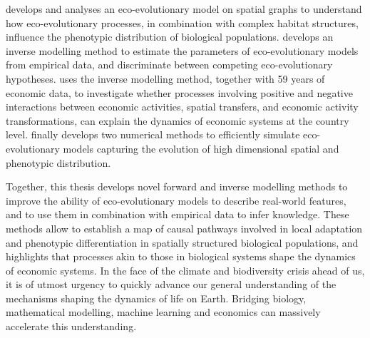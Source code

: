 \Cref{\chapi} develops and analyses an eco-evolutionary model on spatial graphs to understand how eco-evolutionary processes, in combination with complex habitat structures, influence the phenotypic distribution of biological populations. \Cref{\chapii} develops an inverse modelling method to estimate the parameters of eco-evolutionary models from empirical data, and discriminate between competing eco-evolutionary hypotheses. \Cref{\chapiv} uses the inverse modelling method, together with 59 years of economic data, to investigate whether processes involving positive and negative interactions between economic activities, spatial transfers, and economic activity transformations, can explain the dynamics of economic systems at the country level. \Cref{\chapiv} finally develops two numerical methods to efficiently simulate eco-evolutionary models capturing the evolution of high dimensional spatial and phenotypic distribution.

Together, this thesis develops novel forward and inverse modelling methods to improve the ability of eco-evolutionary models to describe real-world features, and to use them in combination with empirical data to infer knowledge. These methods allow to establish a map of causal pathways involved in local adaptation and phenotypic differentiation in spatially structured biological populations, and highlights that processes akin to those in biological systems shape the dynamics of economic systems. 
% 
In the face of the climate and biodiversity crisis ahead of us, it is of utmost urgency to quickly advance our general understanding of the mechanisms shaping the dynamics of life on Earth.
% 
Bridging biology, mathematical modelling, machine learning and economics can massively accelerate this understanding.





